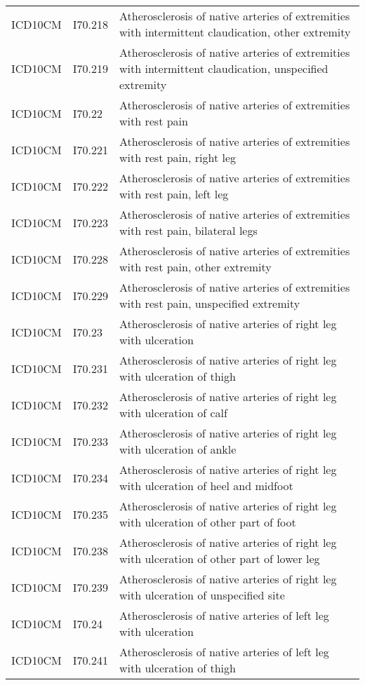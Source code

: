 \begin{longtable}{p{}p{}p{}}
  ICD10CM & I70.218 & Atherosclerosis of native arteries of extremities with intermittent claudication, other extremity \\ 
  ICD10CM & I70.219 & Atherosclerosis of native arteries of extremities with intermittent claudication, unspecified extremity \\ 
  ICD10CM & I70.22 & Atherosclerosis of native arteries of extremities with rest pain \\ 
  ICD10CM & I70.221 & Atherosclerosis of native arteries of extremities with rest pain, right leg \\ 
  ICD10CM & I70.222 & Atherosclerosis of native arteries of extremities with rest pain, left leg \\ 
  ICD10CM & I70.223 & Atherosclerosis of native arteries of extremities with rest pain, bilateral legs \\ 
  ICD10CM & I70.228 & Atherosclerosis of native arteries of extremities with rest pain, other extremity \\ 
  ICD10CM & I70.229 & Atherosclerosis of native arteries of extremities with rest pain, unspecified extremity \\ 
  ICD10CM & I70.23 & Atherosclerosis of native arteries of right leg with ulceration \\ 
  ICD10CM & I70.231 & Atherosclerosis of native arteries of right leg with ulceration of thigh \\ 
  ICD10CM & I70.232 & Atherosclerosis of native arteries of right leg with ulceration of calf \\ 
  ICD10CM & I70.233 & Atherosclerosis of native arteries of right leg with ulceration of ankle \\ 
  ICD10CM & I70.234 & Atherosclerosis of native arteries of right leg with ulceration of heel and midfoot \\ 
  ICD10CM & I70.235 & Atherosclerosis of native arteries of right leg with ulceration of other part of foot \\ 
  ICD10CM & I70.238 & Atherosclerosis of native arteries of right leg with ulceration of other part of lower leg \\ 
  ICD10CM & I70.239 & Atherosclerosis of native arteries of right leg with ulceration of unspecified site \\ 
  ICD10CM & I70.24 & Atherosclerosis of native arteries of left leg with ulceration \\ 
  ICD10CM & I70.241 & Atherosclerosis of native arteries of left leg with ulceration of thigh \\ 

\end{longtable}
